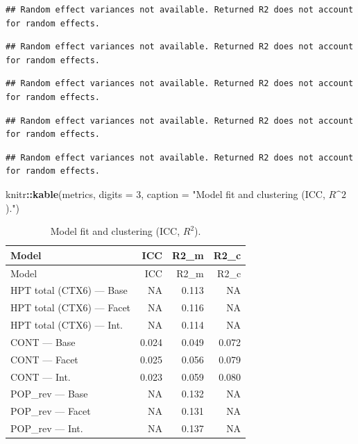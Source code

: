 \documentclass[
  10pt,
]{article}
\newenvironment{Shaded}{\begin{snugshade}}{\end{snugshade}}
\newcommand{\AttributeTok}[1]{\textcolor[rgb]{0.13,0.29,0.53}{#1}}
\newcommand{\DecValTok}[1]{\textcolor[rgb]{0.00,0.00,0.81}{#1}}
\newcommand{\FunctionTok}[1]{\textcolor[rgb]{0.13,0.29,0.53}{\textbf{#1}}}
\newcommand{\NormalTok}[1]{#1}
\newcommand{\SpecialCharTok}[1]{\textcolor[rgb]{0.81,0.36,0.00}{\textbf{#1}}}
\newcommand{\StringTok}[1]{\textcolor[rgb]{0.31,0.60,0.02}{#1}}
\begin{document}
\begin{verbatim}
## Random effect variances not available. Returned R2 does not account for random effects.
\end{verbatim}

\begin{verbatim}
## Random effect variances not available. Returned R2 does not account for random effects.
\end{verbatim}

\begin{verbatim}
## Random effect variances not available. Returned R2 does not account for random effects.
\end{verbatim}

\begin{verbatim}
## Random effect variances not available. Returned R2 does not account for random effects.
\end{verbatim}

\begin{verbatim}
## Random effect variances not available. Returned R2 does not account for random effects.
\end{verbatim}

\begin{Shaded}
\begin{Highlighting}[]
\NormalTok{knitr}\SpecialCharTok{::}\FunctionTok{kable}\NormalTok{(metrics, }\AttributeTok{digits =} \DecValTok{3}\NormalTok{, }\AttributeTok{caption =} \StringTok{"Model fit and clustering (ICC, $R\^{}2$)."}\NormalTok{)}
\end{Highlighting}
\end{Shaded}

\begin{longtable}[]{@{}lrrr@{}}
\caption{Model fit and clustering (ICC, \(R^2\)).}\tabularnewline
\toprule\noalign{}
Model & ICC & R2\_m & R2\_c \\
\midrule\noalign{}
\endfirsthead
\toprule\noalign{}
Model & ICC & R2\_m & R2\_c \\
\midrule\noalign{}
\endhead
\bottomrule\noalign{}
\endlastfoot
HPT total (CTX6) --- Base & NA & 0.113 & NA \\
HPT total (CTX6) --- Facet & NA & 0.116 & NA \\
HPT total (CTX6) --- Int. & NA & 0.114 & NA \\
CONT --- Base & 0.024 & 0.049 & 0.072 \\
CONT --- Facet & 0.025 & 0.056 & 0.079 \\
CONT --- Int. & 0.023 & 0.059 & 0.080 \\
POP\_rev --- Base & NA & 0.132 & NA \\
POP\_rev --- Facet & NA & 0.131 & NA \\
POP\_rev --- Int. & NA & 0.137 & NA \\
\end{longtable}
\end{document}
